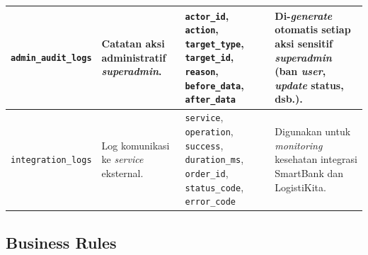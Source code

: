 \begin{longtable}{|L{2.8cm}|L{3cm}|L{4.7cm}|L{4cm}|}
    \texttt{admin\_audit\_logs}
        & Catatan aksi administratif \textit{superadmin}.
        & \texttt{actor\_id}, \texttt{action}, \texttt{target\_type},
          \texttt{target\_id}, \texttt{reason}, \texttt{before\_data},
          \texttt{after\_data}
        & Di-\textit{generate} otomatis setiap aksi sensitif \textit{superadmin}
          (ban \textit{user}, \textit{update} status, dsb.). \\
    \hline
    \texttt{integration\_logs}
        & Log komunikasi ke \textit{service} eksternal.
        & \texttt{service}, \texttt{operation}, \texttt{success},
          \texttt{duration\_ms}, \texttt{order\_id}, \texttt{status\_code},
          \texttt{error\_code}
        & Digunakan untuk \textit{monitoring} kesehatan integrasi SmartBank dan
          LogistiKita. \\
    \hline
\end{longtable}

\subsection{Business Rules}

